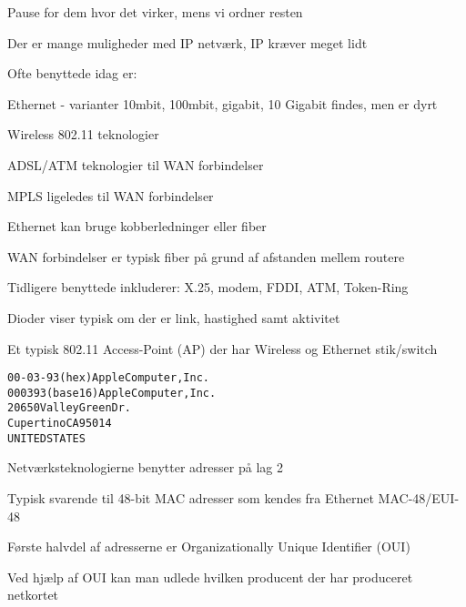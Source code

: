\centerline{Pause for dem hvor det virker, mens vi ordner resten}






\begin{list1}
\item Der er mange muligheder med IP netværk, IP kræver meget lidt
\item Ofte benyttede idag er:
\begin{list2}
\item Ethernet - varianter 10mbit, 100mbit, gigabit, 10 Gigabit findes, men er dyrt
\item Wireless 802.11 teknologier
\item ADSL/ATM teknologier til WAN forbindelser
\item MPLS ligeledes til WAN forbindelser
\end{list2}
\item Ethernet kan bruge kobberledninger eller fiber
\item WAN forbindelser er typisk fiber på grund af afstanden mellem routere
\item Tidligere benyttede inkluderer: X.25, modem, FDDI, ATM, Token-Ring
\end{list1}



\centerline{Dioder viser typisk om der er link, hastighed samt aktivitet}



\begin{list1}
\item Et typisk 802.11 Access-Point (AP) der har Wireless og Ethernet stik/switch
\end{list1}


\begin{alltt}
00-03-93   (hex)        Apple Computer, Inc.
000393     (base 16)    Apple Computer, Inc.
                        20650 Valley Green Dr.
                        Cupertino CA 95014
                        UNITED STATES
\end{alltt}
\begin{list1}
\item Netværksteknologierne benytter adresser på lag 2
\item Typisk svarende til 48-bit MAC adresser som kendes fra Ethernet MAC-48/EUI-48
\item Første halvdel af adresserne er Organizationally Unique Identifier (OUI)
\item Ved hjælp af OUI kan man udlede hvilken producent der har produceret netkortet
\item {}
\end{list1}

